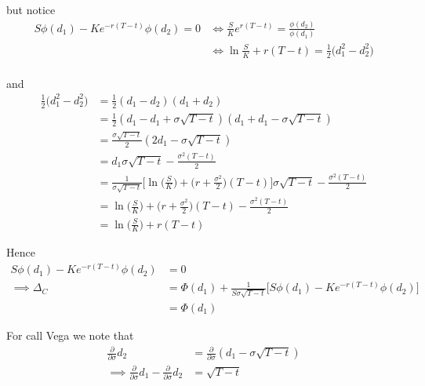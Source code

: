 \documentclass[11pt]{article}
\begin{document}
but notice
\begin{align*}
	S\phi(d_1) - Ke^{-r(T - t)}\phi(d_2) = 0 &\iff \frac{S}{K}e^{r(T - t)} = \frac{\phi(d_2)}{\phi(d_1)} \\
	&\iff \ln \frac{S}{K} + r(T - t) = \frac{1}{2}\big(d_1^2 - d_2^2\big) \\
\end{align*}

and
\begin{align*}
	\frac{1}{2}\big(d_1^2 - d_2^2\big) &= \frac{1}{2}(d_1 - d_2)(d_1 + d_2) \\
	&= \frac{1}{2}(d_1 - d_1 + \sigma\sqrt{T - t})(d_1 + d_1 - \sigma\sqrt{T - t}) \\
	&= \frac{\sigma\sqrt{T - t}}{2}(2d_1 - \sigma\sqrt{T - t}) \\
	&= d_1\sigma\sqrt{T - t} - \frac{\sigma^2(T - t)}{2} \\
	&= \frac{1}{\sigma\sqrt{T - t}} \bigg[\ln\bigg(\frac{S}{K}\bigg) + \bigg(r + \frac{\sigma^2}{2}\bigg)(T - t) \bigg] \sigma\sqrt{T - t} - \frac{\sigma^2(T - t)}{2} \\
	&= \ln\bigg(\frac{S}{K}\bigg) + \bigg(r + \frac{\sigma^2}{2}\bigg)(T - t) - \frac{\sigma^2(T - t)}{2} \\
	&= \ln\bigg(\frac{S}{K}\bigg) + r(T - t) 
\end{align*}

Hence
\begin{align*}
	S\phi(d_1) - Ke^{-r(T - t)}\phi(d_2) &= 0 \\
	\implies \Delta_C &= \Phi(d_1) + \frac{1}{S\sigma\sqrt{T - t}}\Big[S\phi(d_1) - Ke^{-r(T - t)}\phi(d_2) \Big] \\
	&= \Phi(d_1)
\end{align*}

For call Vega we note that
\begin{align*}
	\frac{\partial}{\partial \sigma}d_2 &= \frac{\partial}{\partial \sigma}(d_1 - \sigma\sqrt{T - t}) \\
	\implies \frac{\partial}{\partial \sigma}d_1 - \frac{\partial}{\partial \sigma}d_2 &= \sqrt{T - t}
\end{align*}
\end{document}
